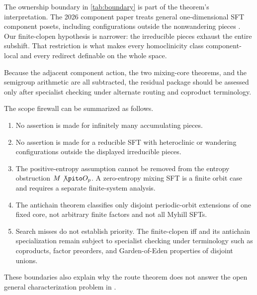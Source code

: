 

The ownership boundary in \cref{tab:boundary} is part of the theorem's
interpretation.  The 2026 component paper treats general one-dimensional SFT
component posets, including configurations outside the nonwandering pieces
\cite{ceccheriniCoornaertSalo2026}.  Our finite-clopen hypothesis is narrower:
the irreducible pieces exhaust the entire subshift.  That restriction is what
makes every homoclinicity class component-local and every redirect definable
on the whole space.

Because the adjacent component action, the two mixing-core theorems, and the
semigroup arithmetic are all subtracted, the residual package should be
assessed only after specialist checking under alternate routing and coproduct
terminology.

The scope firewall can be summarized as follows.

\begin{enumerate}[label=(\alph*)]
  \item No assertion is made for infinitely many accumulating pieces.
  \item No assertion is made for a reducible SFT with heteroclinic or wandering
  configurations outside the displayed irreducible pieces.
  \item The positive-entropy assumption cannot be removed from the entropy
  obstruction $M\not\pito O_p$.  A zero-entropy mixing SFT is a finite orbit
  case and requires a separate finite-system analysis.
  \item The antichain theorem classifies only disjoint periodic-orbit
  extensions of one fixed core, not arbitrary finite factors and not all
  Myhill SFTs.
  \item Search misses do not establish priority.  The finite-clopen iff and
  its antichain specialization remain subject to specialist checking under
  terminology such as coproducts, factor preorders, and Garden-of-Eden
  properties of disjoint unions.
\end{enumerate}

These boundaries also explain why the route theorem does not answer the open
general characterization problem in
\cite[Section~9]{ceccheriniCoornaertSalo2026}.
